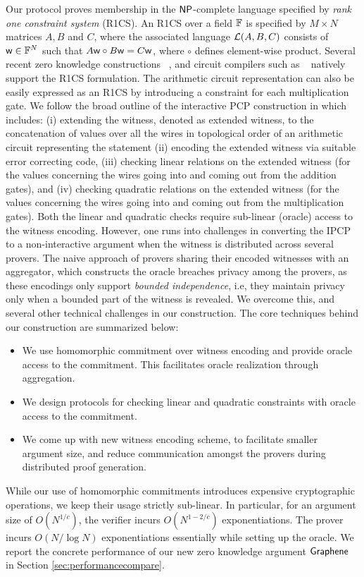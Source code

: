 Our protocol proves membership in the $\mathsf{NP}$-complete
language specified by {\em rank one constraint system} (R1CS). An R1CS over a
field $\mathbb{F}$ is specified by $M\times N$ matrices $A,B$ and $C$, where the
associated language $\mathcal{L}(A,B,C)$ consists of $\mathsf{w}\in \mathbb{F}^N$ such that
$A\mathsf{w}\circ B\mathsf{w}=C\mathsf{w}$, where $\circ$ defines element-wise product. Several
recent zero knowledge constructions ~\cite{Groth16,aurora,marlin}, and 
circuit compilers such as ~\cite{zokrates} natively support the R1CS formulation. 
The arithmetic circuit representation can also be easily
expressed as an R1CS by introducing a constraint for each multiplication gate.
We follow the broad outline of the interactive PCP
construction in \cite{ligero} which includes: (i) extending the witness, denoted as extended witness, to the concatenation of values over all the wires in topological order of an arithmetic circuit  representing the statement   (ii) encoding the extended witness via suitable
error correcting code, (iii) checking linear relations on the extended witness (for the values concerning the wires going into and coming out from the addition gates), and
(iv) checking quadratic relations on
the extended witness  (for the values concerning the wires going into and coming out from the multiplication gates). Both the linear and quadratic checks require sub-linear (oracle) access to the 
witness encoding.
However, one runs into 
challenges in converting the IPCP to a non-interactive
argument when the witness is distributed across several provers. The naive
approach of provers sharing their encoded witnesses with an aggregator, which
constructs the oracle breaches privacy among the provers, as these encodings
only support {\em bounded independence}, i.e, they maintain privacy only when a
bounded part of the witness is revealed. We overcome this, and several other
technical challenges in our construction. The core techniques behind our
construction are summarized below:
\begin{itemize}
\item We use homomorphic commitment over witness encoding and provide oracle
access to the commitment. This facilitates oracle realization through
aggregation.
\item We design protocols for checking linear and quadratic constraints
with oracle access to the commitment.
\item We come up with new witness encoding scheme, to facilitate smaller
argument size, and reduce communication amongst the provers during distributed proof
generation.
\end{itemize}
While our use of homomorphic commitments introduces expensive cryptographic
operations, we keep their usage strictly sub-linear. In particular, for an
argument size of $O(N^{1/c})$, the verifier 
incurs $O(N^{1-2/c})$ exponentiations. The prover incurs
$O(N/\log N)$ exponentiations essentially while
setting up the oracle. We report the concrete performance of our new zero
knowledge argument $\textsf{Graphene}$ in Section
\ref{sec:performancecompare}.
